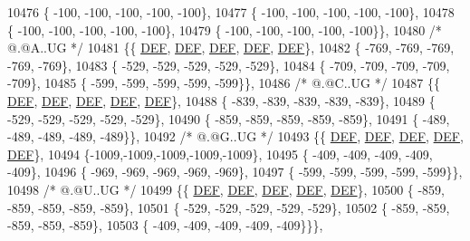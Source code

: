 \begin{DoxyCode}
10476 \{ -100, -100, -100, -100, -100\},
10477 \{ -100, -100, -100, -100, -100\},
10478 \{ -100, -100, -100, -100, -100\},
10479 \{ -100, -100, -100, -100, -100\}\},
10480 \textcolor{comment}{/*  @.@A..UG */}
10481 \{\{  \mbox{\hyperlink{1_88_84__epars_8h_a397419fc12b37ed479c8abb9d444d843}{DEF}},  \mbox{\hyperlink{1_88_84__epars_8h_a397419fc12b37ed479c8abb9d444d843}{DEF}},  \mbox{\hyperlink{1_88_84__epars_8h_a397419fc12b37ed479c8abb9d444d843}{DEF}},  \mbox{\hyperlink{1_88_84__epars_8h_a397419fc12b37ed479c8abb9d444d843}{DEF}},  \mbox{\hyperlink{1_88_84__epars_8h_a397419fc12b37ed479c8abb9d444d843}{DEF}}\},
10482 \{ -769, -769, -769, -769, -769\},
10483 \{ -529, -529, -529, -529, -529\},
10484 \{ -709, -709, -709, -709, -709\},
10485 \{ -599, -599, -599, -599, -599\}\},
10486 \textcolor{comment}{/*  @.@C..UG */}
10487 \{\{  \mbox{\hyperlink{1_88_84__epars_8h_a397419fc12b37ed479c8abb9d444d843}{DEF}},  \mbox{\hyperlink{1_88_84__epars_8h_a397419fc12b37ed479c8abb9d444d843}{DEF}},  \mbox{\hyperlink{1_88_84__epars_8h_a397419fc12b37ed479c8abb9d444d843}{DEF}},  \mbox{\hyperlink{1_88_84__epars_8h_a397419fc12b37ed479c8abb9d444d843}{DEF}},  \mbox{\hyperlink{1_88_84__epars_8h_a397419fc12b37ed479c8abb9d444d843}{DEF}}\},
10488 \{ -839, -839, -839, -839, -839\},
10489 \{ -529, -529, -529, -529, -529\},
10490 \{ -859, -859, -859, -859, -859\},
10491 \{ -489, -489, -489, -489, -489\}\},
10492 \textcolor{comment}{/*  @.@G..UG */}
10493 \{\{  \mbox{\hyperlink{1_88_84__epars_8h_a397419fc12b37ed479c8abb9d444d843}{DEF}},  \mbox{\hyperlink{1_88_84__epars_8h_a397419fc12b37ed479c8abb9d444d843}{DEF}},  \mbox{\hyperlink{1_88_84__epars_8h_a397419fc12b37ed479c8abb9d444d843}{DEF}},  \mbox{\hyperlink{1_88_84__epars_8h_a397419fc12b37ed479c8abb9d444d843}{DEF}},  \mbox{\hyperlink{1_88_84__epars_8h_a397419fc12b37ed479c8abb9d444d843}{DEF}}\},
10494 \{-1009,-1009,-1009,-1009,-1009\},
10495 \{ -409, -409, -409, -409, -409\},
10496 \{ -969, -969, -969, -969, -969\},
10497 \{ -599, -599, -599, -599, -599\}\},
10498 \textcolor{comment}{/*  @.@U..UG */}
10499 \{\{  \mbox{\hyperlink{1_88_84__epars_8h_a397419fc12b37ed479c8abb9d444d843}{DEF}},  \mbox{\hyperlink{1_88_84__epars_8h_a397419fc12b37ed479c8abb9d444d843}{DEF}},  \mbox{\hyperlink{1_88_84__epars_8h_a397419fc12b37ed479c8abb9d444d843}{DEF}},  \mbox{\hyperlink{1_88_84__epars_8h_a397419fc12b37ed479c8abb9d444d843}{DEF}},  \mbox{\hyperlink{1_88_84__epars_8h_a397419fc12b37ed479c8abb9d444d843}{DEF}}\},
10500 \{ -859, -859, -859, -859, -859\},
10501 \{ -529, -529, -529, -529, -529\},
10502 \{ -859, -859, -859, -859, -859\},
10503 \{ -409, -409, -409, -409, -409\}\}\},

\end{DoxyCode}
